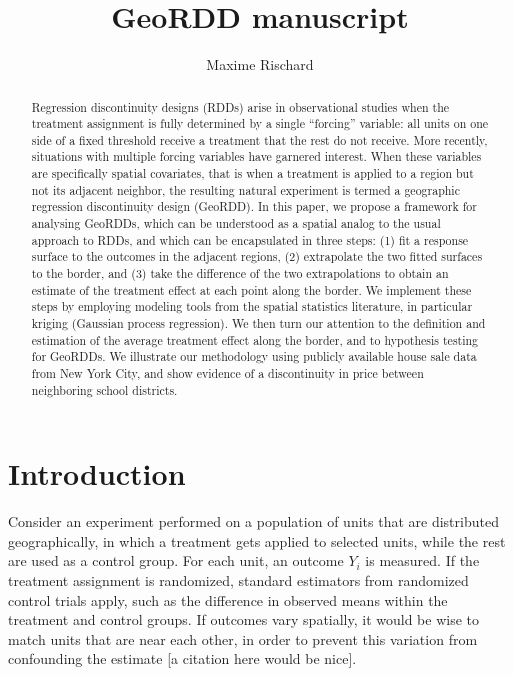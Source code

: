\documentclass[letter]{article}
\title{GeoRDD manuscript}
\author{Maxime Rischard}
\begin{document}
    
    
    
    \maketitle
    
    
	\tableofcontents


    




\begin{abstract}
    	Regression discontinuity designs (RDDs) arise in observational studies when the treatment assignment is fully determined by a single ``forcing'' variable: all units on one side of a fixed threshold receive a treatment that the rest do not receive.
More recently, situations with multiple forcing variables have garnered interest.
When these variables are specifically spatial covariates, that is when a treatment is applied to a region but not its adjacent neighbor, the resulting natural experiment is termed a geographic regression discontinuity design (GeoRDD).
In this paper, we propose a framework for analysing GeoRDDs, which can be understood as a spatial analog to the usual approach to RDDs, and which can be encapsulated in three steps:
(1) fit a response surface to the outcomes in the adjacent regions,
(2) extrapolate the two fitted surfaces to the border, and
(3) take the difference of the two extrapolations to obtain an estimate of the treatment effect at each point along the border.
We implement these steps by employing modeling tools from the spatial statistics literature, in particular kriging (Gaussian process regression).
We then turn our attention to the definition and estimation of the average treatment effect along the border, and to hypothesis testing for GeoRDDs.
We illustrate our methodology using publicly available house sale data from New York City,
and show evidence of a discontinuity in price between neighboring school districts.
    

\end{abstract}
    	\section{Introduction}\label{introduction}
    


    	Consider an experiment performed on a population of units that are distributed geographically,
in which a treatment gets applied to selected units, while the rest are used as a control group.
For each unit, an outcome \(Y_i\) is measured.
If the treatment assignment is randomized, standard estimators from randomized control trials apply, such as the difference in observed means within the treatment and control groups.
If outcomes vary spatially, it would be wise to match units that are near each other, in order to prevent this variation from confounding the estimate {[}a citation here would be nice{]}.
\end{document}
